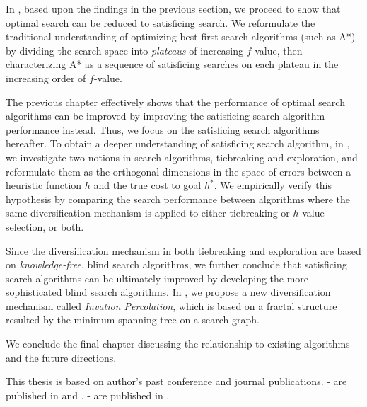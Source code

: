 In , based upon the findings in the previous section,
we proceed to show that optimal search can be reduced to satisficing
search. We reformulate the traditional understanding of optimizing
best-first search algorithms (such as A*) by dividing the search space
into \emph{plateaus} of increasing $f$-value, then characterizing A* as a
sequence of satisficing searches on each plateau in the increasing order
of $f$-value.

The previous chapter effectively shows that the performance of optimal
search algorithms can be improved by improving the satisficing search
algorithm performance instead.
Thus, we focus on the satisficing search algorithms hereafter.
To obtain a deeper understanding of satisficing search algorithm,
in , we investigate two notions in search algorithms,
tiebreaking and exploration,
and reformulate them as the orthogonal dimensions in the space
of errors between a heuristic function $h$ and the true cost to goal $h^*$.
We empirically verify this hypothesis by comparing the search performance between algorithms
where the same diversification mechanism is applied to either tiebreaking or $h$-value selection, or both.

Since the diversification mechanism in both tiebreaking and exploration
are based on \emph{knowledge-free}, blind search algorithms, we further
conclude that satisficing search algorithms can be ultimately improved
by developing the more sophisticated blind search algorithms.
In , we propose a new
diversification mechanism called \emph{Invation Percolation}, which is
based on a fractal structure resulted by the minimum spanning tree on a
search graph.

We conclude the final chapter discussing the relationship to existing
algorithms and the future directions.

This thesis is based on author's past conference and journal publications.
- are published in \cite{Asai2016} and \cite{asai2017tie}.
- are published in \cite{Asai2017b}.
